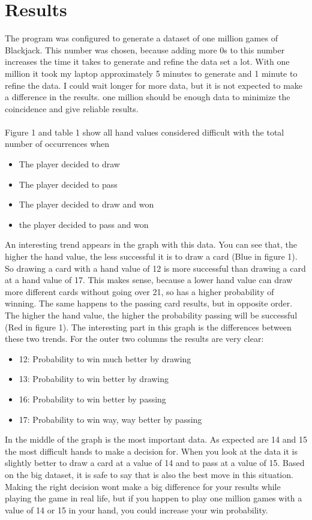 \section{Results}
The program was configured to generate a dataset of one million games of Blackjack. This number was chosen, because adding more 0\textquotesingle s to this number increases the time it takes to generate and refine the data set a lot. With one million it took my laptop approximately 5 minutes to generate and 1 minute to refine the data. I could wait longer for more data, but it is not expected to make a difference in the results. one million should be enough data to minimize the coincidence and give reliable results. \\
 \\
Figure 1 and table 1 show all hand values considered difficult with the total number of occurrences when
\begin{itemize}
    \item The player decided to draw 
    \item The player decided to pass
    \item The player decided to draw and won
    \item the player decided to pass and won 
\end{itemize}
An interesting trend appears in the graph with this data. You can see that, the higher the hand value, the less successful it is to draw a card (Blue in figure 1). So drawing a card with a hand value of 12 is more successful than drawing a card at a hand value of 17. This makes sense, because a lower hand value can draw more different cards without going over 21, so has a higher probability of winning.
The same happens to the passing card results, but in opposite order. The higher the hand value, the higher the probability passing will be successful (Red in figure 1). The interesting part in this graph is the differences between these two trends. For the outer two columns the results are very clear:
\begin{itemize}
    \item 12: Probability to win much better by drawing
    \item 13: Probability to win better by drawing
    \item 16: Probability to win better by passing
    \item 17: Probability to win way, way better by passing 
\end{itemize}
In the middle of the graph is the most important data. As expected are 14 and 15 the most difficult hands to make a decision for. When you look at the data it is slightly better to draw a card at a value of 14 and to pass at a value of 15. Based on the big dataset, it is safe to say that is also the best move in this situation. Making the right decision won\textquotesingle t make a big difference for your results while playing the game in real life, but if you happen to play one million games with a value of 14 or 15 in your hand, you could increase your win probability.

